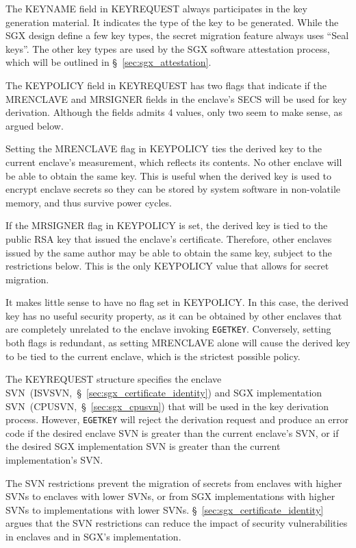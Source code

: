 The KEYNAME field in KEYREQUEST always participates in the key generation
material. It indicates the type of the key to be generated. While the SGX
design define a few key types, the secret migration feature always uses ``Seal
keys''. The other key types are used by the SGX software attestation process,
which will be outlined in \S~\ref{sec:sgx_attestation}.

The KEYPOLICY field in KEYREQUEST has two flags that indicate if the MRENCLAVE
and MRSIGNER fields in the enclave's SECS will be used for key derivation.
Although the fields admits 4 values, only two seem to make sense, as argued
below.

Setting the MRENCLAVE flag in KEYPOLICY ties the derived key to the current
enclave's measurement, which reflects its contents. No other enclave will be
able to obtain the same key. This is useful when the derived key is used to
encrypt enclave secrets so they can be stored by system software in
non-volatile memory, and thus survive power cycles.

If the MRSIGNER flag in KEYPOLICY is set, the derived key is tied to the public
RSA key that issued the enclave's certificate. Therefore, other enclaves issued
by the same author may be able to obtain the same key, subject to the
restrictions below. This is the only KEYPOLICY value that allows for secret
migration.

It makes little sense to have no flag set in KEYPOLICY. In this case, the
derived key has no useful security property, as it can be obtained by other
enclaves that are completely unrelated to the enclave invoking
\texttt{EGETKEY}. Conversely, setting both flags is redundant, as setting
MRENCLAVE alone will cause the derived key to be tied to the current enclave,
which is the strictest possible policy.

The KEYREQUEST structure specifies the enclave
SVN~(ISVSVN,~\S~\ref{sec:sgx_certificate_identity}) and SGX implementation
SVN~(CPUSVN,~\S~\ref{sec:sgx_cpusvn}) that will be used in the key derivation
process. However, \texttt{EGETKEY} will reject the derivation request and
produce an error code if the desired enclave SVN is greater than the current
enclave's SVN, or if the desired SGX implementation SVN is greater than the
current implementation's SVN.

The SVN restrictions prevent the migration of secrets from enclaves with higher
SVNs to enclaves with lower SVNs, or from SGX implementations with higher SVNs
to implementations with lower SVNs. \S~\ref{sec:sgx_certificate_identity}
argues that the SVN restrictions can reduce the impact of security
vulnerabilities in enclaves and in SGX's implementation.

